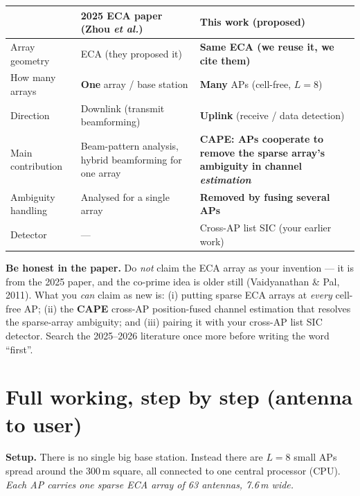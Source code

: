 \documentclass[11pt]{article}
\newcommand{\cape}{\textbf{CAPE}}
\begin{document}
\begin{center}
\renewcommand{\arraystretch}{1.25}
\begin{tabular}{@{}p{4.1cm}p{5.0cm}p{5.0cm}@{}}
\toprule
 & \textbf{2025 ECA paper (Zhou \emph{et al.})} & \textbf{This work (proposed)}\\
\midrule
Array geometry & ECA (they proposed it) & \textbf{Same ECA (we reuse it, we cite them)}\\
How many arrays & \textbf{One} array / base station & \textbf{Many} APs (cell-free, $L=8$)\\
Direction & Downlink (transmit beamforming) & \textbf{Uplink} (receive / data detection)\\
Main contribution & Beam-pattern analysis, hybrid beamforming for one array & \textbf{CAPE: APs cooperate to remove the sparse array's ambiguity in channel \emph{estimation}}\\
Ambiguity handling & Analysed for a single array & \textbf{Removed by fusing several APs}\\
Detector & --- & Cross-AP list SIC (your earlier work)\\
\bottomrule
\end{tabular}
\end{center}

\begin{warnbox}
\textbf{Be honest in the paper.} Do \emph{not} claim the ECA array as your invention --- it is
from the 2025 paper, and the co-prime idea is older still (Vaidyanathan \& Pal, 2011). What you
\emph{can} claim as new is: (i) putting sparse ECA arrays at \emph{every} cell-free AP; (ii) the
\cape{} cross-AP position-fused channel estimation that resolves the sparse-array ambiguity; and
(iii) pairing it with your cross-AP list SIC detector. Search the 2025--2026 literature once more
before writing the word ``first''.
\end{warnbox}

\section{Full working, step by step (antenna to user)}

\textbf{Setup.} There is no single big base station. Instead there are $L=8$ small APs spread
around the 300\,m square, all connected to one central processor (CPU). \emph{Each AP carries one
sparse ECA array of 63 antennas, 7.6\,m wide.}
\end{document}
